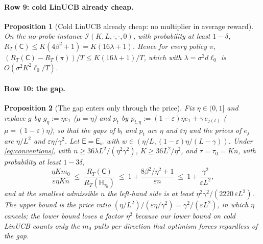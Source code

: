 \documentclass{article}
\newtheorem{proposition}{Proposition}
\theoremstyle{definition}
\theoremstyle{remark}
\newcommand{\eps}{\varepsilon}
\theoremstyle{remark}
\newcommand{\Cold}{\mathsf{C}}
\newcommand{\Exp}{\mathsf{E}}
\newcommand{\Hyb}{\mathsf{H}}
\begin{document}
\paragraph{Row 9: cold LinUCB already cheap.}
\begin{proposition}[Cold LinUCB already cheap: no multiplier in average reward]
\label{prop:cat-cheap}
On the no-probe instance $\mathcal I(K,L,\cdot,\cdot,0)$, with probability
at least $1-\delta$, $R_T(\Cold)\le K(4\beta^2+1)=K(16\lambda+1)$. Hence for
\emph{every} policy $\pi$, $(R_T(\Cold)-R_T(\pi))/T\le K(16\lambda+1)/T$, which with
$\lambda=\sigma^2d\ell_0$ is $O(\sigma^2K^2\ell_0/T)$.
\end{proposition}

\paragraph{Row 10: the gap.}
\begin{proposition}[The gap enters only through the price]
\label{prop:cat-gap}
Fix $\eta\in(0,1]$ and replace $g$ by $g_\eta:=\eta e_1$ ($\mu=\eta$) and
$p_t$ by $p_{t,\eta}:=(1-\eps)\eta e_1+\gamma\,e_{j(t)}$ ($\mu=(1-\eps)\eta$), so that
the gaps of $b_t$ and $p_t$ are $\eta$ and $\eps\eta$ and the prices of
$e_j$ are $\eta/L^2$ and $\eps\eta/\gamma^2$. Let $\Exp=\Exp_w$ with
$w\in(\eta/L,(1-\eps)\eta/(L-\gamma))$. Under \eqref{eq:conventions}, with
$n\ge36\lambda L^2/(\eta^2\gamma^2)$, $K\ge36L^2/\eta^2$, and $\tau=\tau_0=Kn$, with
probability at least $1-3\delta$,
\[
\frac{\eta Km_0}{\eps\eta Kn}\ \le\
\frac{R_T(\Cold)}{R_T(\Hyb_{\tau_0})}\ \le\ 1+\frac{8\beta^2/\eta^2+1}{\eps n}\ \le\ 1+\frac{\gamma^2}{\eps L^2},
\]
and at the smallest admissible $n$ the left-hand side is at least
$\eta^2\gamma^2/(2220\,\eps L^2)$.
The upper bound is the price ratio $(\eta/L^2)/(\eps\eta/\gamma^2)=\gamma^2/(\eps L^2)$,
in which $\eta$ cancels; the lower bound loses a factor $\eta^2$ because our
lower bound on cold LinUCB counts only the $m_0$ pulls per direction that
optimism forces regardless of the gap.
\end{proposition}
\end{document}

